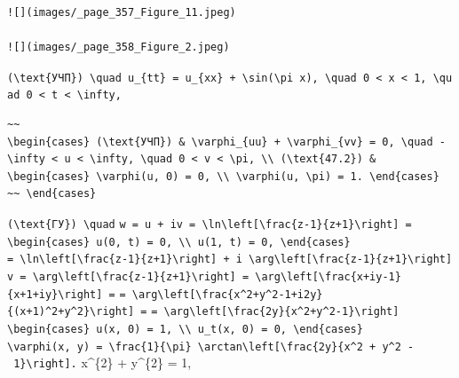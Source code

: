 \documentclass[
  ukrainian,
]{article}
\begin{document}
\begin{verbatim}
![](images/_page_357_Figure_11.jpeg)

![](images/_page_358_Figure_2.jpeg)
\end{verbatim}

\texttt{(\textbackslash{}text\{УЧП\})\ \textbackslash{}quad\ u\_\{tt\}\ =\ u\_\{xx\}\ +\ \textbackslash{}sin(\textbackslash{}pi\ x),\ \textbackslash{}quad\ 0\ \textless{}\ x\ \textless{}\ 1,\ \textbackslash{}quad\ 0\ \textless{}\ t\ \textless{}\ \textbackslash{}infty,}

\begin{verbatim}
~~
\begin{cases} (\text{УЧП}) & \varphi_{uu} + \varphi_{vv} = 0, \quad -\infty < u < \infty, \quad 0 < v < \pi, \\ (\text{47.2}) & \begin{cases} \varphi(u, 0) = 0, \\ \varphi(u, \pi) = 1. \end{cases}
~~ \end{cases}
\end{verbatim}

\texttt{(\textbackslash{}text\{ГУ\})\ \textbackslash{}quad}
\texttt{w\ =\ u\ +\ iv\ =\ \textbackslash{}ln\textbackslash{}left{[}\textbackslash{}frac\{z-1\}\{z+1\}\textbackslash{}right{]}\ =}
\texttt{\textbackslash{}begin\{cases\}\ u(0,\ t)\ =\ 0,\ \textbackslash{}\textbackslash{}\ u(1,\ t)\ =\ 0,\ \textbackslash{}end\{cases\}}
\texttt{=\ \textbackslash{}ln\textbackslash{}left{[}\textbackslash{}frac\{z-1\}\{z+1\}\textbackslash{}right{]}\ +\ i\ \textbackslash{}arg\textbackslash{}left{[}\textbackslash{}frac\{z-1\}\{z+1\}\textbackslash{}right{]}}
\texttt{v\ =\ \textbackslash{}arg\textbackslash{}left{[}\textbackslash{}frac\{z-1\}\{z+1\}\textbackslash{}right{]}\ =\ \textbackslash{}arg\textbackslash{}left{[}\textbackslash{}frac\{x+iy-1\}\{x+1+iy\}\textbackslash{}right{]}\ =}
\texttt{=\ \textbackslash{}arg\textbackslash{}left{[}\textbackslash{}frac\{x\^{}2+y\^{}2-1+i2y\}\{(x+1)\^{}2+y\^{}2\}\textbackslash{}right{]}\ =}
\texttt{=\ \textbackslash{}arg\textbackslash{}left{[}\textbackslash{}frac\{2y\}\{x\^{}2+y\^{}2-1\}\textbackslash{}right{]}}
\texttt{\textbackslash{}begin\{cases\}\ u(x,\ 0)\ =\ 1,\ \textbackslash{}\textbackslash{}\ u\_t(x,\ 0)\ =\ 0,\ \textbackslash{}end\{cases\}}
\texttt{\textbackslash{}varphi(x,\ y)\ =\ \textbackslash{}frac\{1\}\{\textbackslash{}pi\}\ \textbackslash{}arctan\textbackslash{}left{[}\textbackslash{}frac\{2y\}\{x\^{}2\ +\ y\^{}2\ -\ 1\}\textbackslash{}right{]}.}
x\^{}\{2\} + y\^{}\{2\} = 1,
\end{document}
